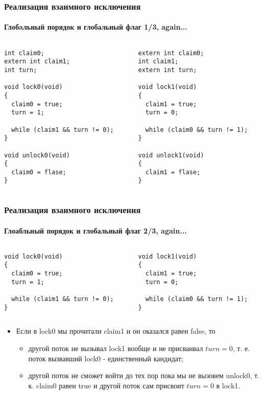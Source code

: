 \begin{frame}[fragile]
\frametitle{Реализация взаимного исключения}
\framesubtitle{Глобaльный порядок и глобальный флаг 1/3, again...}
\begin{columns}
  \begin{column}{.45\linewidth}
    \begin{lstlisting}
int claim0;
extern int claim1;
int turn;

void lock0(void)
{
  claim0 = true;
  turn = 1;

  while (claim1 && turn != 0);
}

void unlock0(void)
{
  claim0 = flase;
}
    \end{lstlisting}
  \end{column}
  \begin{column}{.45\linewidth}
    \begin{lstlisting}
extern int claim0;
int claim1;
extern int turn;

void lock1(void)
{
  claim1 = true;
  turn = 0;

  while (claim0 && turn != 1);
}

void unlock1(void)
{
  claim1 = flase;
}
    \end{lstlisting}
  \end{column}
\end{columns}
\end{frame}

\begin{frame}[fragile]
\frametitle{Реализация взаимного исключения}
\framesubtitle{Глоабльный порядок и глобальный флаг 2/3, again...}
\begin{columns}
  \begin{column}{.45\linewidth}
    \begin{lstlisting}
void lock0(void)
{
  claim0 = true;
  turn = 1;

  while (claim1 && turn != 0);
}
    \end{lstlisting}
  \end{column}
  \begin{column}{.45\linewidth}
    \begin{lstlisting}
void lock1(void)
{
  claim1 = true;
  turn = 0;

  while (claim0 && turn != 1);
}
    \end{lstlisting}
  \end{column}
\end{columns}
\begin{itemize}
  \item Если в lock0 мы прочитали claim1 и он оказался равен false, то
  \begin{itemize}
    \item другой поток не вызывал lock1 вообще и не присваивал $turn = 0$,
    т. е. поток вызвавший lock0 - единственный кандидат;
    \item другой поток не сможет войти до тех пор пока мы не вызовем unlock0,
    т. к. claim0 равен true и другой поток сам присвоит $turn = 0$ в lock1.
  \end{itemize}
\end{itemize}
\end{frame}

